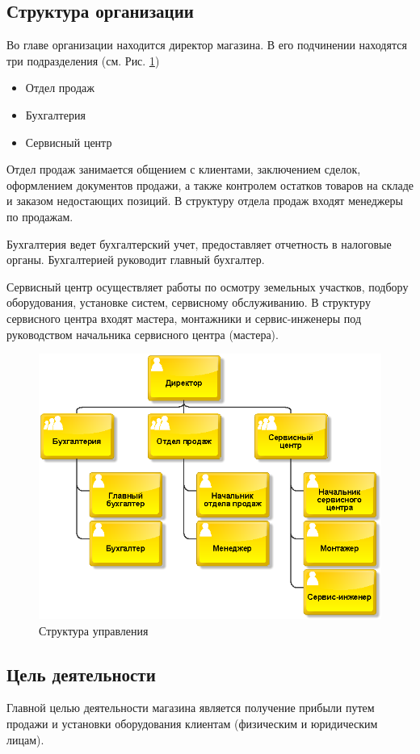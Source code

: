 \documentclass[a4paper,12pt]{article}
\begin{document}
\subsection{Структура организации}
Во главе организации находится директор магазина. В его подчинении находятся три подразделения (см. Рис. \ref{fig:company_structure})
\begin{itemize}
    \item Отдел продаж
    \item Бухгалтерия
    \item Сервисный центр
\end{itemize}

Отдел продаж занимается общением с клиентами, заключением сделок, оформлением документов продажи, а также контролем остатков товаров на складе и заказом недостающих позиций. В структуру отдела продаж входят менеджеры по продажам.

Бухгалтерия ведет бухгалтерский учет, предоставляет отчетность в налоговые органы. Бухгалтерией руководит главный бухгалтер.

Сервисный центр осуществляет работы по осмотру земельных участков, подбору оборудования, установке систем, сервисному обслуживанию. В структуру сервисного центра входят мастера, монтажники и сервис-инженеры под руководством начальника сервисного центра (мастера).

\begin{figure}[H]
    \centering
    \includegraphics[width=0.8\linewidth]{company_structure.png}
    \caption{Структура управления}
    \label{fig:company_structure}
\end{figure}

\subsection{Цель деятельности}
Главной целью деятельности магазина является получение прибыли путем продажи и установки оборудования клиентам (физическим и юридическим лицам).
\end{document}
